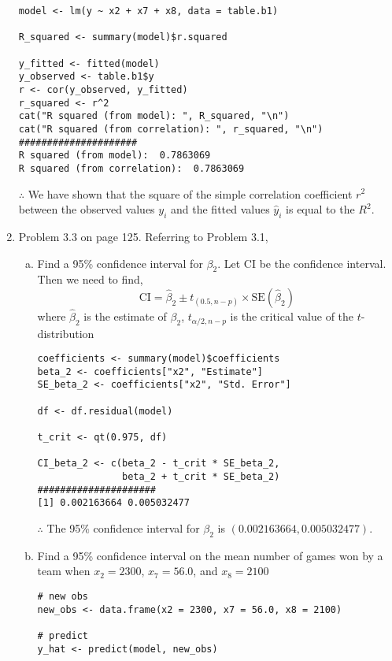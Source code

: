 \documentclass[12pt]{article}
\begin{document}
\begin{enumerate}[1.]
                \begin{verbatim}
model <- lm(y ~ x2 + x7 + x8, data = table.b1)

R_squared <- summary(model)$r.squared

y_fitted <- fitted(model)
y_observed <- table.b1$y
r <- cor(y_observed, y_fitted)
r_squared <- r^2
cat("R squared (from model): ", R_squared, "\n")
cat("R squared (from correlation): ", r_squared, "\n")
#####################
R squared (from model):  0.7863069 
R squared (from correlation):  0.7863069 
                \end{verbatim}
                $\therefore$ We have shown that the square of the simple correlation 
                coefficient $r^2$ between the observed values $y_i$ and the fitted values
                 $\hat{y}_i$ is equal to the $R^2$.
        \item Problem 3.3 on page 125.
                Referring to Problem 3.1, 
                \begin{enumerate}[a.]
                    \item Find a 95\% confidence interval for $\beta_2$. Let $\text{CI}$ be the confidence interval.
                    Then we need to find, 
                    \[ \text{CI} = \hat{\beta}_2 \pm t_{(0.5, n - p)} \times \text{SE}(\hat{\beta}_2)\]
                    where $\hat{\beta}_2$ is the estimate of $\beta_2$, $t_{\alpha/2, n - p}$ is the critical value of the $t$-distribution
                    \begin{verbatim}
coefficients <- summary(model)$coefficients
beta_2 <- coefficients["x2", "Estimate"]
SE_beta_2 <- coefficients["x2", "Std. Error"]

df <- df.residual(model)

t_crit <- qt(0.975, df)

CI_beta_2 <- c(beta_2 - t_crit * SE_beta_2, 
               beta_2 + t_crit * SE_beta_2)
#####################
[1] 0.002163664 0.005032477
                    \end{verbatim}
                    $\therefore$ The 95\% confidence interval for $\beta_2$ is $(0.002163664, 0.005032477)$.
                    \item Find a 95\% confidence interval on the mean number of games won
                    by a team when $x_2 = 2300$, $x_7 = 56.0$, and $x_8 = 2100$
                    \begin{verbatim}
# new obs
new_obs <- data.frame(x2 = 2300, x7 = 56.0, x8 = 2100)

# predict
y_hat <- predict(model, new_obs)


\end{verbatim}
\end{enumerate}
\end{enumerate}
\end{document}
